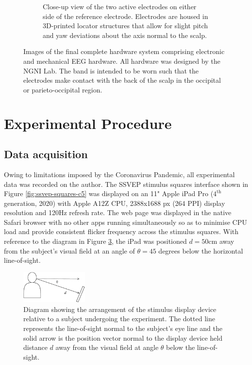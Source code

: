 \begin{figure}
\begin{subfigure}[c]{0.48\textwidth}
         \caption{Close-up view of the two active electrodes on either side of the reference electrode. Electrodes are housed in 3D-printed locator structures that allow for slight pitch and yaw deviations about the axis normal to the scalp.}
         \label{fig:final-headband-electrodes}
     \end{subfigure}
        \caption{Images of the final complete hardware system comprising electronic and mechanical EEG hardware. All hardware was designed by the NGNI Lab. The band is intended to be worn such that the electrodes make contact with the back of the scalp in the occipital or parieto-occipital region.}
        \label{fig:final-headband-subfigs}
\end{figure}

\section{Experimental Procedure}
\subsection{Data acquisition}
Owing to limitations imposed by the Coronavirus Pandemic, all experimental data was recorded on the author. The SSVEP stimulus squares interface shown in Figure \ref{fig:ssvep-squares-c5} was displayed on an 11" Apple iPad Pro ($4^{\textrm{th}}$ generation, 2020) with Apple A12Z CPU, 2388x1688 px (264 PPI) display resolution and 120Hz refresh rate. The web page was displayed in the native Safari browser with no other apps running simultaneously so as to minimise CPU load and provide consistent flicker frequency across the stimulus squares. With reference to the diagram in Figure \ref{fig:visual-setup-diagram}, the iPad was positioned $d=50$cm away from the subject's visual field at an angle of $\theta=45$ degrees below the horizontal line-of-sight.

\begin{figure}[!htb]
    \centering
    \includegraphics[width=0.3\textwidth]{visual-setup-diagram}
    \caption[Diagram showing the arrangement of the stimulus display device relative to a subject undergoing the experiment]{Diagram showing the arrangement of the stimulus display device relative to a subject undergoing the experiment. The dotted line represents the line-of-sight normal to the subject's eye line and the solid arrow is the position vector normal to the display device held distance $d$ away from the visual field at angle $\theta$ below the line-of-sight.}
    \label{fig:visual-setup-diagram}
\end{figure}

